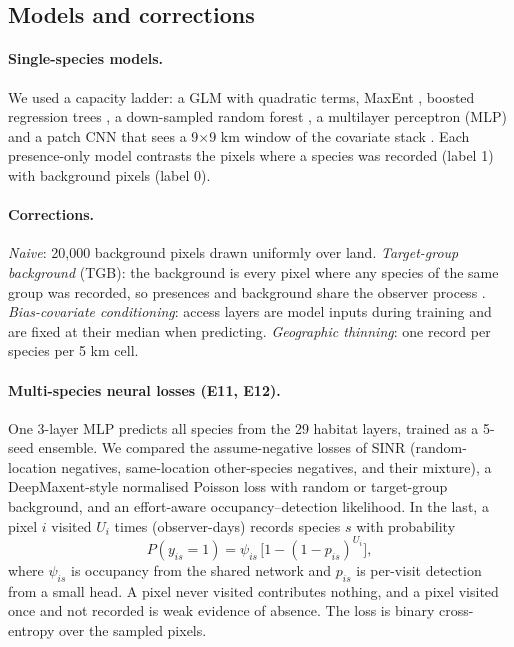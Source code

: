 \documentclass[11pt]{article}
\begin{document}
\subsection{Models and corrections}
\paragraph{Single-species models.} We used a capacity ladder: a GLM with quadratic terms, MaxEnt \citep{phillips2006}, boosted regression trees \citep[BRT, LightGBM;][]{friedman2001,ke2017}, a down-sampled random forest \citep{breiman2001,valavi2022}, a multilayer perceptron (MLP) and a patch CNN that sees a 9$\times$9 km window of the covariate stack \citep{deneu2021}. Each presence-only model contrasts the pixels where a species was recorded (label 1) with background pixels (label 0).

\paragraph{Corrections.} \emph{Naive}: 20,000 background pixels drawn uniformly over land. \emph{Target-group background} (TGB): the background is every pixel where any species of the same group was recorded, so presences and background share the observer process \citep{phillips2009}. \emph{Bias-covariate conditioning}: access layers are model inputs during training and are fixed at their median when predicting. \emph{Geographic thinning}: one record per species per 5 km cell.

\paragraph{Multi-species neural losses (E11, E12).} One 3-layer MLP predicts all species from the 29 habitat layers, trained as a 5-seed ensemble. We compared the assume-negative losses of SINR \citep{cole2023} (random-location negatives, same-location other-species negatives, and their mixture), a DeepMaxent-style normalised Poisson loss \citep{ryckewaert2025} with random or target-group background, and an effort-aware occupancy--detection likelihood. In the last, a pixel $i$ visited $U_i$ times (observer-days) records species $s$ with probability
\begin{equation}
P(y_{is}=1) = \psi_{is}\,\bigl[1-(1-p_{is})^{U_i}\bigr],
\label{eq:occeffort}
\end{equation}
where $\psi_{is}$ is occupancy from the shared network and $p_{is}$ is per-visit detection from a small head. A pixel never visited contributes nothing, and a pixel visited once and not recorded is weak evidence of absence. The loss is binary cross-entropy over the sampled pixels.
\end{document}
